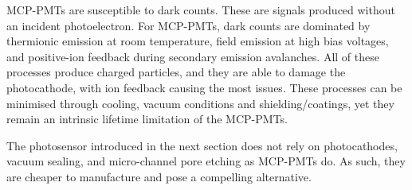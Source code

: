 MCP-PMTs are susceptible to dark counts. These are signals produced without an incident photoelectron. For MCP-PMTs, dark counts are dominated by thermionic emission at room temperature, field emission at high bias voltages, and positive-ion feedback during secondary emission avalanches. All of these processes produce charged particles, and they are able to damage the photocathode, with ion feedback causing the most issues. These processes can be minimised through cooling, vacuum conditions and shielding/coatings, yet they remain an intrinsic lifetime limitation of the MCP-PMTs. 

The photosensor introduced in the next section does not rely on photocathodes, vacuum sealing, and micro-channel pore etching as MCP-PMTs do. As such, they are cheaper to manufacture and pose a compelling alternative.
